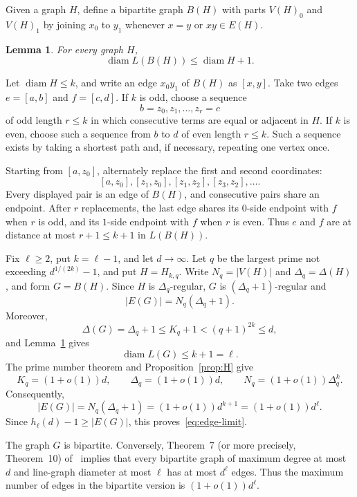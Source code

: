 \documentclass[11pt]{article}
\makeatletter
\theoremstyle{plain}
\newtheorem{lemma}[theorem]{Lemma}
\theoremstyle{definition}
\renewenvironment{proof}[1][\proofname]
{\par\pushQED{\qed}
	\normalfont\topsep6\p@\@plus6\p@\relax\trivlist
	\item[\hskip\labelsep\bfseries#1\@addpunct{.}]
	\ignorespaces}
{\popQED\endtrivlist\@endpefalse}
\DeclareMathOperator{\diam}{diam}
\makeatother
\begin{document}
Given a graph $H$, define a bipartite graph $B(H)$ with parts $V(H)_0$ and $V(H)_1$ by joining $x_0$ to $y_1$ whenever $x=y$ or $xy\in E(H)$.

\begin{lemma}\label{lem:edge-reduction}
For every graph $H$,
$$ \diam L(B(H))\le\diam H+1.$$
\end{lemma}

\begin{proof}
Let $\diam H\le k$, and write an edge $x_0y_1$ of $B(H)$ as $[x,y]$.
Take two edges $e=[a,b]$ and $f=[c,d]$.  If $k$ is odd, choose a sequence
$$b=z_0,z_1,\ldots,z_r=c$$
of odd length $r\le k$ in which consecutive terms are equal or adjacent in $H$.  If $k$ is even, choose such a sequence from $b$ to $d$ of even length $r\le k$.  Such a sequence exists by taking a shortest path and, if necessary, repeating one vertex once.

Starting from $[a,z_0]$, alternately replace the first and second coordinates:
$$[a,z_0],[z_1,z_0],[z_1,z_2],[z_3,z_2],\ldots.$$
Every displayed pair is an edge of $B(H)$, and consecutive pairs share an endpoint.  After $r$ replacements, the last edge shares its $0$-side
endpoint with $f$ when $r$ is odd, and its $1$-side endpoint with $f$ when $r$ is even.  Thus $e$ and $f$ are at distance at most $r+1\le k+1$ in $L(B(H))$.
\end{proof}

\begin{proof}[Proof of Corollary~\ref{cor:edge}]
Fix $\ell\ge2$, put $k=\ell-1$, and let $d\to\infty$.  Let $q$ be the
largest prime not exceeding $d^{1/(2k)}-1$, and put $H=H_{k,q}$.  Write
$N_q=|V(H)|$ and $\Delta_q=\Delta(H)$, and form $G=B(H)$.  Since $H$ is
$\Delta_q$-regular, $G$ is $(\Delta_q+1)$-regular and
$$|E(G)|=N_q(\Delta_q+1).$$
Moreover,
$$\Delta(G)=\Delta_q+1\le K_q+1
  <(q+1)^{2k}\le d,$$
and Lemma~\ref{lem:edge-reduction} gives
$$\diam L(G)\le k+1=\ell.$$
The prime number theorem and Proposition~\ref{prop:H} give
$$K_q=(1+o(1))d,
  \qquad
  \Delta_q=(1+o(1))d,
  \qquad
  N_q=(1+o(1))\Delta_q^k.$$
Consequently,
$$|E(G)|=N_q(\Delta_q+1)
  =(1+o(1))d^{k+1}=(1+o(1))d^\ell.$$
Since $h_\ell(d)-1\ge|E(G)|$, this proves~\eqref{eq:edge-limit}.

The graph $G$ is bipartite.  Conversely, Theorem~7 (or more precisely, Theorem~10) of~\cite{CCJK} 
implies that every bipartite graph of maximum degree at most $d$ and line-graph diameter at most $\ell$ has at most $d^\ell$ edges.  Thus the maximum number of edges in the bipartite version is $(1+o(1))d^\ell$.
\end{proof}
\end{document}

